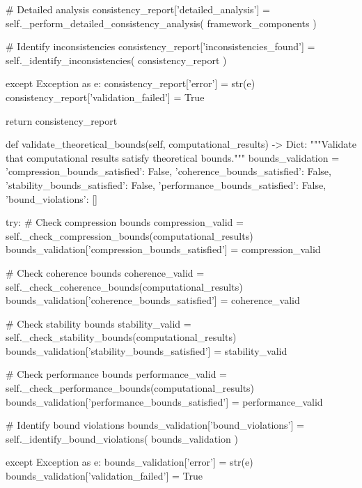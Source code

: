            \# Detailed analysis
            consistency_report['detailed_analysis'] = self._perform_detailed_consistency_analysis(
                framework_components
            )
            
            \# Identify inconsistencies
            consistency_report['inconsistencies_found'] = self._identify_inconsistencies(
                consistency_report
            )
            
        except Exception as e:
            consistency_report['error'] = str(e)
            consistency_report['validation_failed'] = True
            
        return consistency_report
        
    def validate_theoretical_bounds(self, computational_results) -> Dict:
        """Validate that computational results satisfy theoretical bounds."""
        bounds_validation = {
            'compression_bounds_satisfied': False,
            'coherence_bounds_satisfied': False,
            'stability_bounds_satisfied': False,
            'performance_bounds_satisfied': False,
            'bound_violations': []
        }
        
        try:
            \# Check compression bounds
            compression_valid = self._check_compression_bounds(computational_results)
            bounds_validation['compression_bounds_satisfied'] = compression_valid
            
            \# Check coherence bounds
            coherence_valid = self._check_coherence_bounds(computational_results)
            bounds_validation['coherence_bounds_satisfied'] = coherence_valid
            
            \# Check stability bounds
            stability_valid = self._check_stability_bounds(computational_results)
            bounds_validation['stability_bounds_satisfied'] = stability_valid
            
            \# Check performance bounds
            performance_valid = self._check_performance_bounds(computational_results)
            bounds_validation['performance_bounds_satisfied'] = performance_valid
            
            \# Identify bound violations
            bounds_validation['bound_violations'] = self._identify_bound_violations(
                bounds_validation
            )
            
        except Exception as e:
            bounds_validation['error'] = str(e)
            bounds_validation['validation_failed'] = True
            
